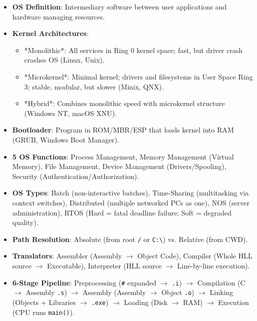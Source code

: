\begin{quickrevision}
\begin{itemize}
    \item \textbf{OS Definition}: Intermediary software between user applications and hardware managing resources.
    \item \textbf{Kernel Architectures}:
    \begin{itemize}
        \item *Monolithic*: All services in Ring 0 kernel space; fast, but driver crash crashes OS (Linux, Unix).
        \item *Microkernel*: Minimal kernel; drivers and filesystems in User Space Ring 3; stable, modular, but slower (Minix, QNX).
        \item *Hybrid*: Combines monolithic speed with microkernel structure (Windows NT, macOS XNU).
    \end{itemize}
    \item \textbf{Bootloader}: Program in ROM/MBR/ESP that loads kernel into RAM (GRUB, Windows Boot Manager).
    \item \textbf{5 OS Functions}: Process Management, Memory Management (Virtual Memory), File Management, Device Management (Drivers/Spooling), Security (Authentication/Authorization).
    \item \textbf{OS Types}: Batch (non-interactive batches), Time-Sharing (multitasking via context switches), Distributed (multiple networked PCs as one), NOS (server administration), RTOS (Hard = fatal deadline failure; Soft = degraded quality).
    \item \textbf{Path Resolution}: Absolute (from root \texttt{/} or \texttt{C:\textbackslash{}}) vs. Relative (from CWD).
    \item \textbf{Translators}: Assembler (Assembly $\rightarrow$ Object Code), Compiler (Whole HLL source $\rightarrow$ Executable), Interpreter (HLL source $\rightarrow$ Line-by-line execution).
    \item \textbf{6-Stage Pipeline}: Preprocessing (\texttt{\#} expanded $\rightarrow$ \texttt{.i}) $\rightarrow$ Compilation (C $\rightarrow$ Assembly \texttt{.s}) $\rightarrow$ Assembly (Assembly $\rightarrow$ Object \texttt{.o}) $\rightarrow$ Linking (Objects + Libraries $\rightarrow$ \texttt{.exe}) $\rightarrow$ Loading (Disk $\rightarrow$ RAM) $\rightarrow$ Execution (CPU runs \texttt{main()}).
\end{itemize}
\end{quickrevision}

